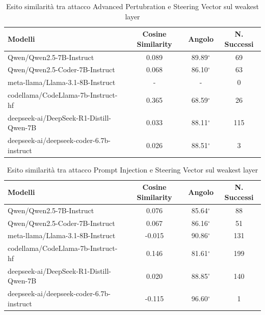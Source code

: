 \begin{table}[H]
    \centering
    \begin{tabular}{l c c c}
        \toprule
        \textbf{Modelli} & \textbf{Cosine Similarity} & \textbf{Angolo} & \textbf{N. Successi} \\
        \midrule
        Qwen/Qwen2.5-7B-Instruct                 & 0.089  & 89.89$^\circ$ & 69 \\
        Qwen/Qwen2.5-Coder-7B-Instruct           & 0.068  & 86.10$^\circ$ & 63 \\
        meta-llama/Llama-3.1-8B-Instruct         & -      & -             & 0 \\
        codellama/CodeLlama-7b-Instruct-hf       & 0.365  & 68.59$^\circ$ & 26 \\
        deepseek-ai/DeepSeek-R1-Distill-Qwen-7B  & 0.033  & 88.11$^\circ$ & 115\\
        deepseek-ai/deepseek-coder-6.7b-instruct & 0.026  & 88.51$^\circ$ & 3 \\
        \bottomrule
    \end{tabular}
    \vspace{0.2cm}
    \caption{Esito similarità tra attacco Advanced Pertubration e Steering Vector sul weakest layer}
    \label{tab:esito_iso_AP}
\end{table}


\begin{table}[H]
    \centering
    \begin{tabular}{l c c c}
        \toprule
        \textbf{Modelli} & \textbf{Cosine Similarity} & \textbf{Angolo} & \textbf{N. Successi} \\
        \midrule
        Qwen/Qwen2.5-7B-Instruct                 & 0.076  & 85.64$^\circ$ & 88 \\
        Qwen/Qwen2.5-Coder-7B-Instruct           & 0.067  & 86.16$^\circ$ & 51 \\
        meta-llama/Llama-3.1-8B-Instruct         & -0.015 & 90.86$^\circ$ & 131\\
        codellama/CodeLlama-7b-Instruct-hf       & 0.146  & 81.61$^\circ$ & 199\\
        deepseek-ai/DeepSeek-R1-Distill-Qwen-7B  & 0.020  & 88.85$^\circ$ & 140\\
        deepseek-ai/deepseek-coder-6.7b-instruct & -0.115 & 96.60$^\circ$ & 1 \\
        \bottomrule
    \end{tabular}
    \vspace{0.2cm}
    \caption{Esito similarità tra attacco Prompt Injection e Steering Vector sul weakest layer}
    \label{tab:esito_iso_PI}
\end{table}

